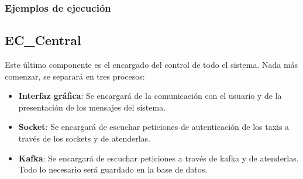 \documentclass[a4paper,12pt]{article}
\begin{document}
\subsubsection{Ejemplos de ejecución}
\begin{figure}[h]
  \centering
\end{figure}
\begin{figure}[h]
  \centering
\end{figure}
\clearpage
\subsection{EC\_Central}
Este último componente es el encargado del control de todo el sistema. Nada más comenzar, se separará en tres procesos:
\begin{itemize}
  \item \textbf{Interfaz gráfica}: Se encargará de la comunicación con el usuario y de la presentación de los mensajes del sistema.
  \item \textbf{Socket}: Se encargará de escuchar peticiones de autenticación de los taxis a través de los sockets y de atenderlas.
  \item \textbf{Kafka}: Se encargará de escuchar peticiones a través de kafka y de atenderlas. Todo lo necesario será guardado
        en la base de datos.
\end{itemize}
\end{document}

